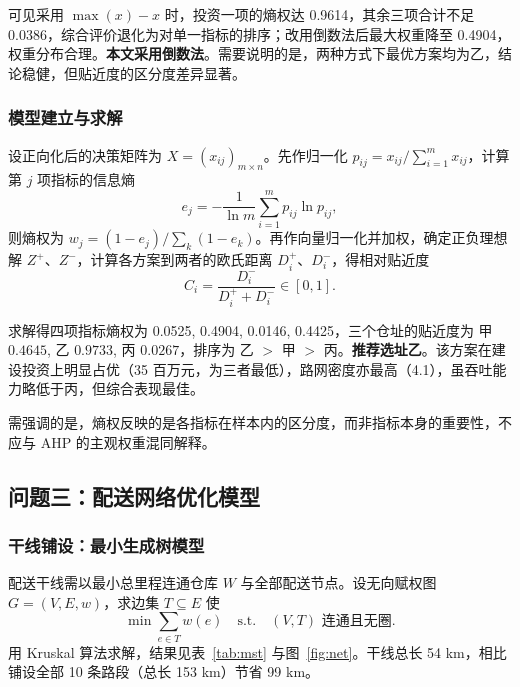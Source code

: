 \documentclass[12pt]{article}
\begin{document}
可见采用 $\max(x)-x$ 时，投资一项的熵权达 0.9614，其余三项合计不足 0.0386，综合评价退化为对单一指标的排序；改用倒数法后最大权重降至 0.4904，权重分布合理。\textbf{本文采用倒数法}。需要说明的是，两种方式下最优方案均为乙，结论稳健，但贴近度的区分度差异显著。

\subsubsection{模型建立与求解}

设正向化后的决策矩阵为 $X = (x_{ij})_{m \times n}$。先作归一化 $p_{ij} = x_{ij} / \sum_{i=1}^{m} x_{ij}$，计算第 $j$ 项指标的信息熵
\begin{equation}
e_j = -\frac{1}{\ln m} \sum_{i=1}^{m} p_{ij} \ln p_{ij} ,
\end{equation}
则熵权为 $w_j = (1 - e_j) / \sum_{k} (1 - e_k)$。再作向量归一化并加权，确定正负理想解 $Z^{+}$、$Z^{-}$，计算各方案到两者的欧氏距离 $D_i^{+}$、$D_i^{-}$，得相对贴近度
\begin{equation}
C_i = \frac{D_i^{-}}{D_i^{+} + D_i^{-}} \in [0, 1] .
\end{equation}

求解得四项指标熵权为 0.0525, 0.4904, 0.0146, 0.4425，三个仓址的贴近度为 甲 $0.4645$, 乙 $0.9733$, 丙 $0.0267$，排序为 乙 $>$ 甲 $>$ 丙。\textbf{推荐选址乙}。该方案在建设投资上明显占优（35 百万元，为三者最低），路网密度亦最高（4.1），虽吞吐能力略低于丙，但综合表现最佳。

需强调的是，熵权反映的是各指标在样本内的区分度，而非指标本身的重要性，不应与 AHP 的主观权重混同解释。

\FloatBarrier

\subsection{问题三：配送网络优化模型}

\subsubsection{干线铺设：最小生成树模型}

配送干线需以最小总里程连通仓库 $W$ 与全部配送节点。设无向赋权图 $G = (V, E, w)$，求边集 $T \subseteq E$ 使
\begin{equation}
\min \sum_{e \in T} w(e) \quad \text{s.t.} \quad (V, T) \text{ 连通且无圈} .
\end{equation}
用 Kruskal 算法求解，结果见表~\ref{tab:mst} 与图~\ref{fig:net}。干线总长 54 km，相比铺设全部 10 条路段（总长 153 km）节省 99 km。
\end{document}

